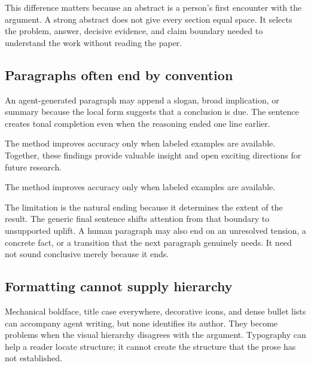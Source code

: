 This difference matters because an abstract is a person's first encounter with
the argument. A strong abstract does not give every section equal space. It
selects the problem, answer, decisive evidence, and claim boundary needed to
understand the work without reading the paper.

\subsection{Paragraphs often end by convention}

An agent-generated paragraph may append a slogan, broad implication, or
summary because the local form suggests that a conclusion is due. The sentence
creates tonal completion even when the reasoning ended one line earlier.

\agentdraft

The method improves accuracy only when labeled examples are available.
Together, these findings provide valuable insight and open exciting directions
for future research.

\humanrevision

The method improves accuracy only when labeled examples are available.

The limitation is the natural ending because it determines the extent of the
result. The generic final sentence shifts attention from that boundary to
unsupported uplift. A human paragraph may also end on an unresolved tension, a
concrete fact, or a transition that the next paragraph genuinely needs. It
need not sound conclusive merely because it ends.

\subsection{Formatting cannot supply hierarchy}

Mechanical boldface, title case everywhere, decorative icons, and dense bullet
lists can accompany agent writing, but none identifies its author. They become
problems when the visual hierarchy disagrees with the argument. Typography can
help a reader locate structure; it cannot create the structure that the prose
has not established.
